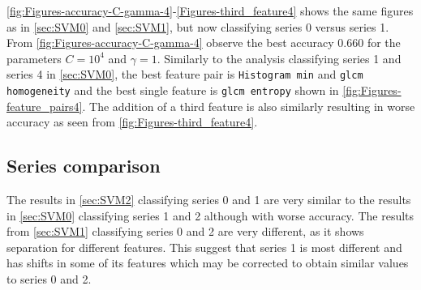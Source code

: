 \autoref{fig:Figures-accuracy-C-gamma-4}-\autoref{Figures-third_feature4} shows the same figures as in \autoref{sec:SVM0} and \autoref{sec:SVM1}, 
but now classifying series 0 versus series 1. From \autoref{fig:Figures-accuracy-C-gamma-4} observe the best accuracy $0.660$ for the 
parameters $C = 10^4$ and $\gamma =1$. Similarly to the analysis classifying series 1 and series 4 in \autoref{sec:SVM0}, the best feature pair is \verb|Histogram min|
and \verb|glcm homogeneity| and the best single feature is \verb|glcm entropy| shown in \autoref{fig:Figures-feature_pairs4}. The addition of a third feature is also similarly 
resulting in worse accuracy as seen from \autoref{fig:Figures-third_feature4}. 

\subsection{Series comparison}

The results in \autoref{sec:SVM2} classifying series 0 and 1 are very similar 
to the results in \autoref{sec:SVM0} classifying series 1 and 2 although with worse accuracy. 
The results from \autoref{sec:SVM1} classifying series 0 and 2 are very different, as it shows 
separation for different features. This suggest 
that series 1 is most different and has shifts in some of its features which may be corrected to obtain similar values 
to series 0 and 2.

